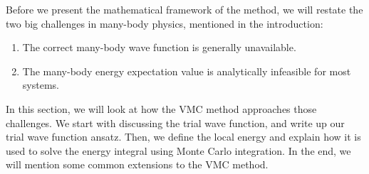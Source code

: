 Before we present the mathematical framework of the method, we will restate the two big challenges in many-body physics, mentioned in the introduction:
\begin{enumerate}
	\item The correct many-body wave function is generally unavailable.
	\item The many-body energy expectation value is analytically infeasible for most systems.
\end{enumerate}
In this section, we will look at how the VMC method approaches those challenges. We start with discussing the trial wave function, and write up our trial wave function ansatz. Then, we define the local energy and explain how it is used to solve the energy integral using Monte Carlo integration. In the end, we will mention some common extensions to the VMC method. 

